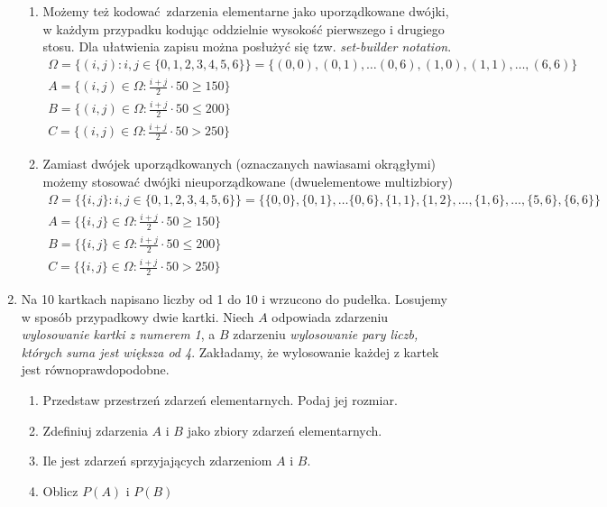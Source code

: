 \documentclass[twoside]{mwart}
\newcommand{\ans}[1]{}
\newcommand{\ans}[1]{\par\emph{Odpowiedź:} #1}
\begin{document}
\begin{enumerate}
{\begin{enumerate}
\begin{enumerate}
\begin{gather*}
			B = \{0, 25, \ldots, 200\} \\
			C = \{275, 300\}
			\end{gather*}
			\item Możemy też kodować zdarzenia elementarne jako uporządkowane dwójki, w każdym przypadku kodując oddzielnie wysokość pierwszego i drugiego stosu. Dla ułatwienia zapisu można posłużyć się tzw. \emph{set-builder notation}.
			\begin{gather*}
			\Omega = \{ (i,j) \colon i,j\in\{0,1,2,3,4,5,6\}\}=\{(0,0), (0, 1), \ldots (0,6), (1,0), (1,1), \ldots, (6,6) \} \\
			A=\{(i,j)\in\Omega \colon \frac{i+j}{2}\cdot 50 \geq 150 \}	\\		
			B=\{(i,j)\in\Omega \colon \frac{i+j}{2}\cdot 50 \leq 200 \}\\
			C=\{(i,j)\in\Omega \colon \frac{i+j}{2}\cdot 50 > 250 \}
			\end{gather*}
			\item Zamiast dwójek uporządkowanych (oznaczanych nawiasami okrągłymi) możemy stosować dwójki nieuporządkowane (dwuelementowe multizbiory)
			\begin{gather*}
			\Omega = \{ \{i,j\} \colon i,j\in\{0,1,2,3,4,5,6\}\}=\{\{0,0\}, \{0, 1\}, \ldots \{0,6\}, \{1,1\}, \{1,2\}, \ldots, \{1,6\}, \ldots, \{5,6\}, \{6,6\} \} \\
			A=\{\{i,j\}\in\Omega \colon \frac{i+j}{2}\cdot 50 \geq 150 \}	\\		
			B=\{\{i,j\}\in\Omega \colon \frac{i+j}{2}\cdot 50 \leq 200 \} \\
			C=\{\{i,j\}\in\Omega \colon \frac{i+j}{2}\cdot 50 > 250 \}
			\end{gather*}
		\end{enumerate}
	\end{enumerate}
}
\item Na 10 kartkach napisano liczby od 1 do 10 i wrzucono do pudełka. Losujemy w sposób przypadkowy dwie kartki. Niech $A$ odpowiada zdarzeniu \emph{wylosowanie kartki z numerem 1}, a $B$ zdarzeniu \emph{wylosowanie pary liczb, których suma jest większa od 4}. Zakładamy, że wylosowanie każdej z kartek jest równoprawdopodobne.
\begin{enumerate}
\item Przedstaw przestrzeń zdarzeń elementarnych. Podaj jej rozmiar. \ans{$\Omega=\{\{i,j\}|i,j\in\{1,\ldots,10\} \land i\neq j\}, \left|\Omega\right|={10 \choose 2}=45$}
\item Zdefiniuj zdarzenia $A$ i $B$ jako zbiory zdarzeń elementarnych. \ans{$A=\{\{i,j\}\in\Omega|i=1 \lor j=1\}$, $B=\{\{i,j\}\in\Omega|i+j>4\}$}
\item Ile jest zdarzeń sprzyjających zdarzeniom $A$ i $B$. \ans{$\left|A\right|=9$, $\left|B\right|=45-4=41$}
\item Oblicz $P(A)$ i $P(B)$ \ans{$P(A)=\frac{9}{45}, P(B)=\frac{41}{45}$}


\end{enumerate}
\end{enumerate}
\end{document}

